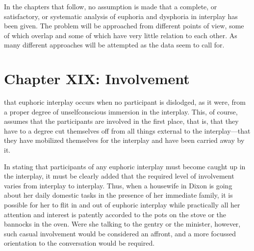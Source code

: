 \documentclass[twoside,symmetric,nobib,justified]{tufte-book}
\let\oldchapter\chapter
\def\chapter{%
  \setcounter{footnote}{0}%
  \oldchapter
}
\begin{document}
In the chapters that follow, no assumption is made that a complete, or
satisfactory, or systematic analysis of euphoria and dysphoria in
interplay has been given. The problem will be approached from different
points of view, some of which overlap and some of which have very little
relation to each other. As many different approaches will be attempted
as the data seem to call for.

\chapter[CHAPTER XIX: INVOLVEMENT]{Chapter XIX: Involvement}
\label{ch:Chapter XIX: Involvement}

 that euphoric interplay occurs when no participant
is dislodged, as it were, from a proper degree of unselfconscious
immersion in the interplay. This, of course, assumes that the
participants are involved in the first place, that is, that they have to
a degree cut themselves off from all things external to the
interplay---that they have mobilized themselves for the interplay and
have been carried away by it.

In stating that participants of any euphoric interplay must become
caught up in the interplay, it must be clearly added that the required
level of involvement varies from interplay to interplay. Thus, when a
housewife in Dixon is going about her daily domestic tasks in the
presence of her immediate family, it is possible for her to flit in and
out of euphoric interplay while practically all her attention and
interest is patently accorded to the pots on the stove or the bannocks
in the oven. Were she talking to the gentry or the minister, however,
such casual involvement would be considered an affront, and a more
focussed orientation to the conversation would be required.
\end{document}
